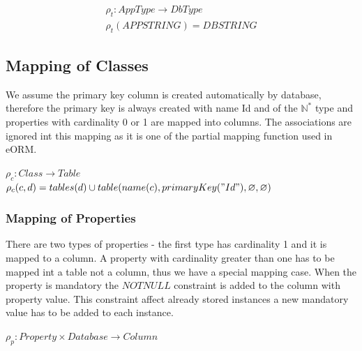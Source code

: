 \documentclass[11pt]{article}
\begin{document}
\begin{equation*}
\begin{gathered}
	\rho_{t} : AppType \rightarrow DbType  \\
 	\rho_{t}(APPSTRING) = DBSTRING 
\end{gathered}
\end{equation*}

\subsection{Mapping of Classes}
We assume the primary key column is created automatically by database, therefore the primary key is always created with name Id and of the $\mathbb{N^{*}}$ type and properties with cardinality 0 or 1 are mapped into columns. The associations are ignored int this mapping as it is one of the partial mapping function used in eORM.

\begin{center}
$\rho_{c}: Class \rightarrow Table $ \\ 
$\rho_{c}(c,d) = tables(d) \cup table(name(c), primaryKey("Id"), \varnothing, \varnothing) $
\end{center}

\subsubsection{Mapping of Properties}
There are two types of properties - the first type has cardinality 1  and it is mapped to a column. A property with cardinality greater than one has to be mapped int a table not a column, thus we have a special mapping case. When the property is mandatory the $NOTNULL$ constraint is added to the column with property value. This constraint affect already stored instances a new mandatory value has to be added to each instance.

$
\rho_p : Property \times Database \rightarrow Column 
$
\end{document}
